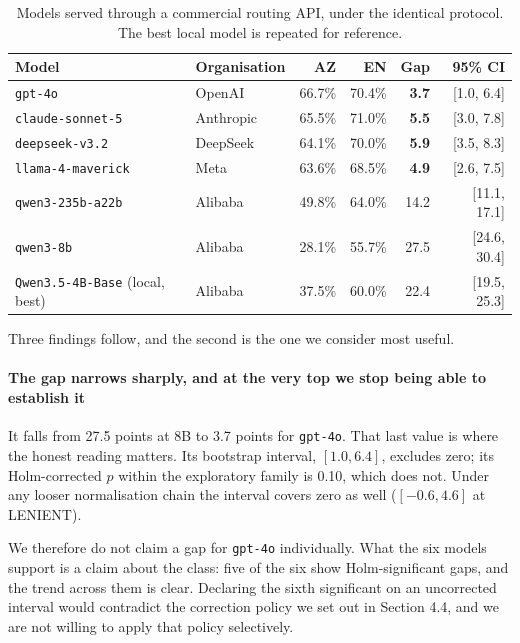 \documentclass[final]{clv2025}
\begin{document}
\begin{table}[h!]
\caption{Models served through a commercial routing API, under the identical
protocol. The best local model is repeated for reference.}
\label{tab:api-models}
\centering
\small
\begin{tabular}{llrrrr}
\toprule
Model & Organisation & AZ & EN & Gap & 95\% CI \\
\midrule
\texttt{gpt-4o} & OpenAI & 66.7\% & 70.4\% & \textbf{3.7} & [1.0, 6.4] \\
\texttt{claude-sonnet-5} & Anthropic & 65.5\% & 71.0\% & \textbf{5.5} & [3.0, 7.8] \\
\texttt{deepseek-v3.2} & DeepSeek & 64.1\% & 70.0\% & \textbf{5.9} & [3.5, 8.3] \\
\texttt{llama-4-maverick} & Meta & 63.6\% & 68.5\% & \textbf{4.9} & [2.6, 7.5] \\
\texttt{qwen3-235b-a22b} & Alibaba & 49.8\% & 64.0\% & 14.2 & [11.1, 17.1] \\
\texttt{qwen3-8b} & Alibaba & 28.1\% & 55.7\% & 27.5 & [24.6, 30.4] \\
\midrule
\texttt{Qwen3.5-4B-Base} (local, best) & Alibaba & 37.5\% & 60.0\% & 22.4 & [19.5, 25.3] \\
\bottomrule
\end{tabular}
\end{table}

Three findings follow, and the second is the one we consider most useful.

\paragraph{The gap narrows sharply, and at the very top we stop being able to
establish it} It falls from 27.5 points at 8B to 3.7 points for
\texttt{gpt-4o}. That last value is where the honest reading matters. Its
bootstrap interval, $[1.0, 6.4]$, excludes zero; its Holm-corrected $p$ within
the exploratory family is 0.10, which does not. Under any looser normalisation
chain the interval covers zero as well ($[-0.6, 4.6]$ at LENIENT).

We therefore do not claim a gap for \texttt{gpt-4o} individually. What the six
models support is a claim about the class: five of the six show Holm-significant
gaps, and the trend across them is clear. Declaring the sixth significant on an
uncorrected interval would contradict the correction policy we set out in
Section 4.4, and we are not willing to apply that policy selectively.
\end{document}
